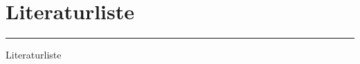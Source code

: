 
\newpage
\section{Literaturliste}
\noindent\rule{\linewidth}{0.4pt}

\begin{small}Literaturliste\end{small}

\vspace{0.22cm}
\printbibliography